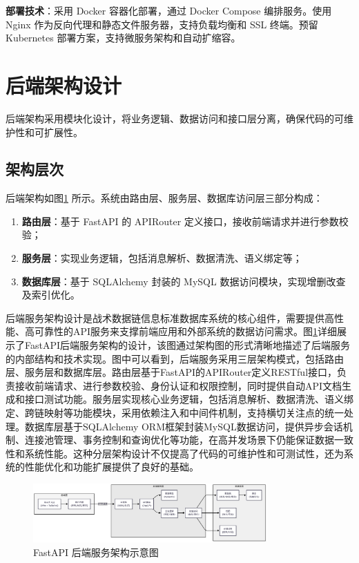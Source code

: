 \textbf{部署技术}：采用 Docker 容器化部署，通过 Docker Compose 编排服务。使用 Nginx 作为反向代理和静态文件服务器，支持负载均衡和 SSL 终端。预留 Kubernetes 部署方案，支持微服务架构和自动扩缩容。

\section{后端架构设计}

后端架构采用模块化设计，将业务逻辑、数据访问和接口层分离，确保代码的可维护性和可扩展性。

\subsection{架构层次}
后端架构如图\ref{fig_fastapi_architecture} 所示。系统由路由层、服务层、数据库访问层三部分构成：  
\begin{enumerate}
  \item \textbf{路由层}：基于 FastAPI 的 APIRouter 定义接口，接收前端请求并进行参数校验；  
  \item \textbf{服务层}：实现业务逻辑，包括消息解析、数据清洗、语义绑定等；  
  \item \textbf{数据库层}：基于 SQLAlchemy 封装的 MySQL 数据访问模块，实现增删改查及索引优化。  
\end{enumerate}

后端服务架构设计是战术数据链信息标准数据库系统的核心组件，需要提供高性能、高可靠性的API服务来支撑前端应用和外部系统的数据访问需求。图\ref{fig_fastapi_architecture}详细展示了FastAPI后端服务架构的设计，该图通过架构图的形式清晰地描述了后端服务的内部结构和技术实现。图中可以看到，后端服务采用三层架构模式，包括路由层、服务层和数据库层。路由层基于FastAPI的APIRouter定义RESTful接口，负责接收前端请求、进行参数校验、身份认证和权限控制，同时提供自动API文档生成和接口测试功能。服务层实现核心业务逻辑，包括消息解析、数据清洗、语义绑定、跨链映射等功能模块，采用依赖注入和中间件机制，支持横切关注点的统一处理。数据库层基于SQLAlchemy ORM框架封装MySQL数据访问，提供异步会话机制、连接池管理、事务控制和查询优化等功能，在高并发场景下仍能保证数据一致性和系统性能。这种分层架构设计不仅提高了代码的可维护性和可测试性，还为系统的性能优化和功能扩展提供了良好的基础。

\begin{figure}[H]
    \centering
    \includegraphics[width=0.8\textwidth,height=0.33\textheight,keepaspectratio]{chapters/fig-0/fastapi-architecture.png}
    \caption{FastAPI 后端服务架构示意图}
    \label{fig_fastapi_architecture}
\end{figure}

